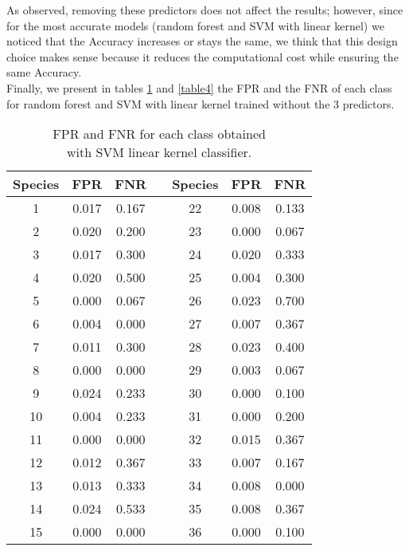 \documentclass{article}
\begin{document}
As observed, removing these predictors does not affect the results; however, since for the most accurate models (random forest and SVM with linear kernel) we noticed that the Accuracy increases or stays the same, we think that this design choice makes sense because it reduces the computational cost while ensuring the same Accuracy.
\\Finally, we present in tables \ref{table3} and \ref{table4} the FPR and the FNR of each class for random forest and SVM with linear kernel trained without the $3$ predictors. 

\begin{table}[h]\footnotesize
\begin{minipage}[]{7cm}
 \begin{adjustwidth}{-3cm}{}
\begin{tabular}{|c|c|c|c|c|c|c| } \hline
Species & FPR & FNR & & Species & FPR & FNR \\
\hline
1 & 0.017 & 0.167 & & 22 & 0.008 & 0.133 \\ 
\hline
2 & 0.020 & 0.200 & & 23 & 0.000 & 0.067 \\ 
\hline
 3 & 0.017 & 0.300 & & 24 & 0.020 & 0.333\\ 
\hline
 4 & 0.020 & 0.500 & & 25 & 0.004 & 0.300 \\ 
\hline
 5 & 0.000 & 0.067 & & 26 & 0.023 & 0.700 \\ 
\hline
 6 & 0.004 & 0.000 & & 27 & 0.007 & 0.367 \\ 
\hline
 7 & 0.011 & 0.300 & & 28 & 0.023 & 0.400 \\ 
\hline
 8 & 0.000 & 0.000 & & 29 & 0.003 & 0.067 \\ 
\hline
 9 & 0.024 & 0.233 & & 30 & 0.000 & 0.100  \\ 
\hline
 10 & 0.004 & 0.233 & & 31 &  0.000 & 0.200 \\ 
\hline
 11 & 0.000 & 0.000 & & 32 & 0.015 & 0.367 \\ 
\hline
 12 & 0.012 & 0.367 & & 33 & 0.007 & 0.167\\ 
\hline
 13 & 0.013 & 0.333 & & 34 & 0.008 & 0.000\\ 
\hline
 14 & 0.024 & 0.533 & & 35 & 0.008 & 0.367\\ 
\hline
 15 & 0.000 & 0.000 & & 36 & 0.000 & 0.100\\  
\hline
\end{tabular}
\caption{FPR and FNR for each class obtained \\ with SVM linear kernel classifier.}\label{table3}
\end{adjustwidth}

\end{minipage}
\end{table}
\end{document}
